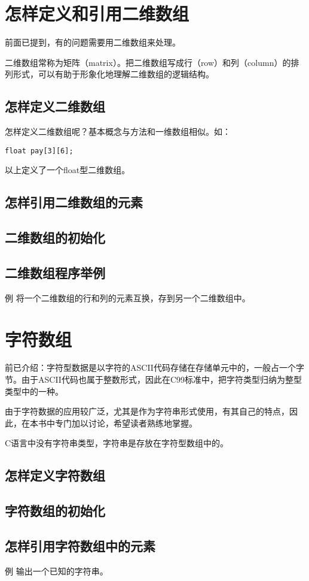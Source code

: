 \section{怎样定义和引用二维数组}
前面已提到，有的问题需要用二维数组来处理。

二维数组常称为矩阵（matrix）。把二维数组写成行（row）和列（column）的排列形式，可以有助于形象化地理解二维数组的逻辑结构。
\subsection{怎样定义二维数组}
怎样定义二维数组呢？基本概念与方法和一维数组相似。如：
\begin{lstlisting}
float pay[3][6];
\end{lstlisting}
以上定义了一个float型二维数组。
\subsection{怎样引用二维数组的元素}
\subsection{二维数组的初始化}
\subsection{二维数组程序举例}
例 将一个二维数组的行和列的元素互换，存到另一个二维数组中。
\section{字符数组}
前已介绍：字符型数据是以字符的ASCII代码存储在存储单元中的，一般占一个字节。由于ASCII代码也属于整数形式，因此在C99标准中，把字符类型归纳为整型类型中的一种。

由于字符数据的应用较广泛，尤其是作为字符串形式使用，有其自己的特点，因此，在本书中专门加以讨论，希望读者熟练地掌握。

C语言中没有字符串类型，字符串是存放在字符型数组中的。
\subsection{怎样定义字符数组}
\subsection{字符数组的初始化}
\subsection{怎样引用字符数组中的元素}
例 输出一个已知的字符串。

